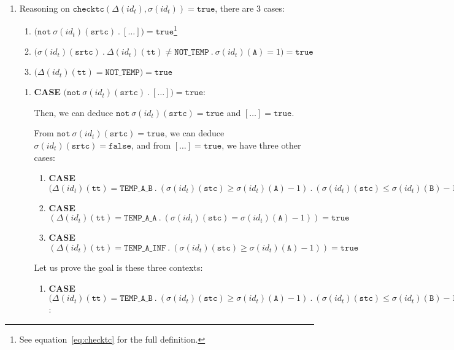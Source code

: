 \documentclass[dvipsnames,12pt]{article}
\begin{document}
\begin{niproof}
\begin{enumerate}
  \item {}

    Reasoning on
    $\mathtt{checktc}(\Delta(id_t),\sigma(id_t))=\mathtt{true}$, there
    are 3 cases:
    \begin{enumerate}
    \item
      $\big(\mathtt{not}~\sigma(id_t)(\texttt{srtc})~.~[\dots]\big)=\mathtt{true}$\footnote{See
        equation~\eqref{eq:checktc} for the full definition.}
    \item
      $\big(\sigma(id_t)(\texttt{srtc})~.~\Delta(id_t)(\texttt{tt})\neq\mathtt{NOT\_TEMP}~.~\sigma(id_t)(\texttt{A})=1\big)=\mathtt{true}$
    \item
      $\big(\Delta(id_t)(\texttt{tt})=\mathtt{NOT\_TEMP}\big)=\mathtt{true}$
    \end{enumerate}
    
    \begin{enumerate}
    \item \textbf{CASE}
      $\big(\mathtt{not}~\sigma(id_t)(\texttt{srtc})~.~[\dots]\big)=\mathtt{true}$:

      Then, we can deduce
      $\mathtt{not}~\sigma(id_t)(\texttt{srtc})=\mathtt{true}$ and
      $[\dots]=\mathtt{true}$.

      From $\mathtt{not}~\sigma(id_t)(\texttt{srtc})=\mathtt{true}$,
      we can deduce $\sigma(id_t)(\texttt{srtc})=\mathtt{false}$, and
      from $[\dots]=\mathtt{true}$, we have three other cases:

      \begin{enumerate}
      \item \textbf{CASE}
        $\big(\Delta(id_t)(\texttt{tt})=\mathtt{TEMP\_A\_B}~.~(\sigma(id_t)(\texttt{stc})\ge{}\sigma(id_t)(\texttt{A})-1)~.~(\sigma(id_t)(\texttt{stc})\le{}\sigma(id_t)(\texttt{B})-1)\big)=\mathtt{true}$
      \item \textbf{CASE}
        $(\Delta(id_t)(\texttt{tt})=\mathtt{TEMP\_A\_A}~.~(\sigma(id_t)(\texttt{stc})={}\sigma(id_t)(\texttt{A})-1))=\mathtt{true}$
      \item \textbf{CASE}
        $(\Delta(id_t)(\texttt{tt})=\mathtt{TEMP\_A\_INF}~.~(\sigma(id_t)(\texttt{stc})\ge{}\sigma(id_t)(\texttt{A})-1))=\mathtt{true}$
      \end{enumerate}

      Let us prove the goal is these three contexts:
      \begin{enumerate}
      \item \textbf{CASE}
        $\big(\Delta(id_t)(\texttt{tt})=\mathtt{TEMP\_A\_B}~.~(\sigma(id_t)(\texttt{stc})\ge{}\sigma(id_t)(\texttt{A})-1)~.~(\sigma(id_t)(\texttt{stc})\le{}\sigma(id_t)(\texttt{B})-1)\big)=\mathtt{true}$:


\end{enumerate}
\end{enumerate}
\end{enumerate}
\end{niproof}
\end{document}

